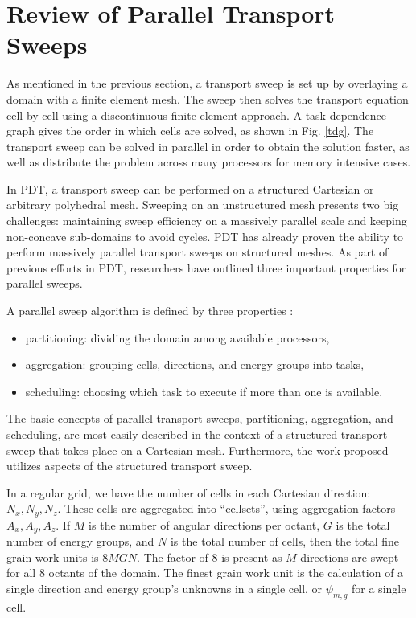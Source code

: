 \documentclass[11pt, letterpaper,titlepage,oneside]{article}
\begin{document}
\section{Review of Parallel Transport Sweeps}

As mentioned in the previous section, a transport sweep is set up by overlaying a domain with a finite element mesh. The sweep then solves the transport equation cell by cell using a discontinuous finite element approach. A task dependence graph gives the order in which cells are solved, as shown in Fig. \ref{tdg}. The transport sweep can be solved in parallel in order to obtain the solution faster, as well as distribute the problem across many processors for memory intensive cases. 


In PDT, a transport sweep can be performed on a structured Cartesian or arbitrary polyhedral mesh. Sweeping on an unstructured mesh presents two big challenges: maintaining sweep efficiency on a massively parallel scale and keeping non-concave sub-domains to avoid cycles. PDT has already proven the ability to perform massively parallel transport sweeps on structured meshes. As part of previous efforts in PDT, researchers have outlined three important properties for parallel sweeps. 

A parallel sweep algorithm is defined by three properties\cite{mpadams2013} :
\begin{itemize}
\item partitioning: dividing the domain among available processors,
\item aggregation: grouping cells, directions, and energy groups into tasks,
\item scheduling: choosing which task to execute if more than one is available.
\end{itemize}

The basic concepts of parallel transport sweeps, partitioning, aggregation, and scheduling, are most easily described in the context of a structured transport sweep that takes place on a Cartesian mesh. Furthermore, the work proposed utilizes aspects of the structured transport sweep.

In a regular grid, we have the  number of cells in each Cartesian direction: $N_x, N_y, N_z$. These cells are aggregated into ``cellsets'', using aggregation factors $A_x, A_y, A_z$. If $M$ is the number of angular directions per octant, $G$ is the total number of energy groups, and $N$ is the total number of cells, then the total fine grain work units is $8MGN$. The factor of 8 is present as $M$ directions are swept for all 8 octants of the domain. The finest grain work unit is the calculation of a single direction and energy group's unknowns in a single cell, or $\psi_{m,g}$ for a single cell.
\end{document}
